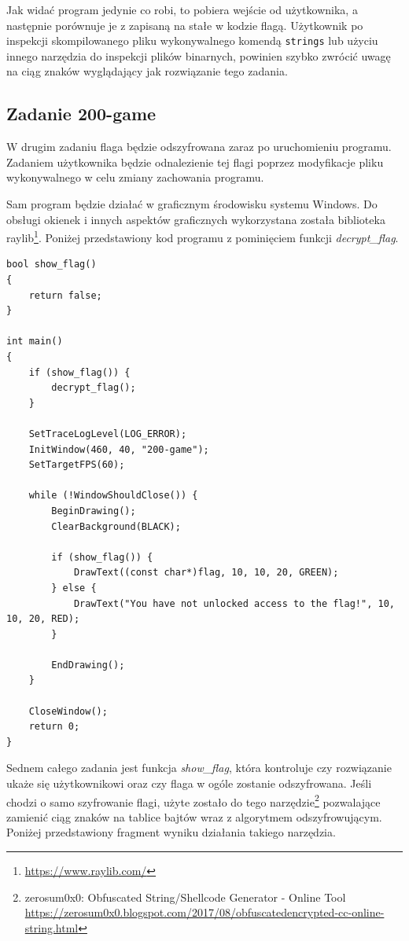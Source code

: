 \documentclass[polish,12pt]{aghthesis}
\begin{document}
Jak widać program jedynie co robi, to pobiera wejście od użytkownika, a następnie
porównuje je z zapisaną na stałe w kodzie flagą. Użytkownik po inspekcji skompilowanego
pliku wykonywalnego komendą \texttt{strings} lub użyciu innego narzędzia
do inspekcji plików binarnych, powinien szybko zwrócić uwagę na
ciąg znaków wyglądający jak rozwiązanie tego zadania.
\clearpage

\subsection{Zadanie 200-game}

W drugim zadaniu flaga będzie odszyfrowana zaraz po uruchomieniu programu. Zadaniem
użytkownika będzie odnalezienie tej flagi poprzez modyfikacje
pliku wykonywalnego w celu zmiany zachowania programu.

Sam program będzie działać w graficznym środowisku systemu Windows.
Do obsługi okienek i innych aspektów graficznych wykorzystana została
biblioteka raylib\footnote{\url{https://www.raylib.com/}}.
Poniżej przedstawiony kod programu z pominięciem funkcji \emph{decrypt\_flag}.

\begin{verbatim}
bool show_flag()
{
    return false;
}

int main()
{
    if (show_flag()) {
        decrypt_flag();
    }

    SetTraceLogLevel(LOG_ERROR);
    InitWindow(460, 40, "200-game");
    SetTargetFPS(60);

    while (!WindowShouldClose()) {
        BeginDrawing();
        ClearBackground(BLACK);

        if (show_flag()) {
            DrawText((const char*)flag, 10, 10, 20, GREEN);
        } else {
            DrawText("You have not unlocked access to the flag!", 10, 10, 20, RED);
        }

        EndDrawing();
    }

    CloseWindow();
    return 0;
}
\end{verbatim}

Sednem całego zadania jest funkcja \emph{show\_flag}, która kontroluje czy rozwiązanie
ukaże się użytkownikowi oraz czy flaga w ogóle zostanie odszyfrowana.
Jeśli chodzi o samo szyfrowanie flagi, użyte zostało do tego narzędzie\footnote{
zerosum0x0: Obfuscated String/Shellcode Generator - Online Tool
\url{https://zerosum0x0.blogspot.com/2017/08/obfuscatedencrypted-cc-online-string.html}}
pozwalające zamienić ciąg znaków na tablice bajtów wraz z algorytmem odszyfrowującym.
Poniżej przedstawiony fragment wyniku działania takiego narzędzia.
\end{document}
